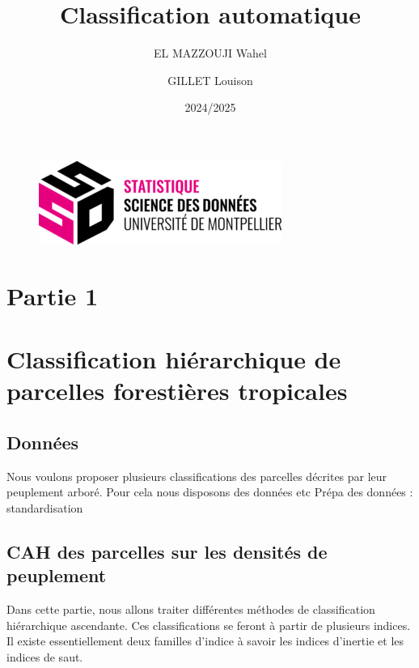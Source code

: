 \documentclass[
]{article}
\title{Classification automatique}
\author{EL MAZZOUJI Wahel \and GILLET Louison}
\date{2024/2025}
\begin{document}
\maketitle

\begin{figure}[h!]
    \centering
    \includegraphics[width=0.5\linewidth]{images/ssd.png}
\end{figure}

\newpage

\tableofcontents

\newpage

\hypertarget{partie-1}{%
\section{Partie 1}\label{partie-1}}

\hypertarget{classification-hiuxe9rarchique-de-parcelles-forestiuxe8res-tropicales}{%
\section{Classification hiérarchique de parcelles forestières
tropicales}\label{classification-hiuxe9rarchique-de-parcelles-forestiuxe8res-tropicales}}

\hypertarget{donnuxe9es}{%
\subsection{Données}\label{donnuxe9es}}

Nous voulons proposer plusieurs classifications des parcelles décrites
par leur peuplement arboré. Pour cela nous disposons des données etc
Prépa des données : standardisation

\hypertarget{cah-des-parcelles-sur-les-densituxe9s-de-peuplement}{%
\subsection{CAH des parcelles sur les densités de
peuplement}\label{cah-des-parcelles-sur-les-densituxe9s-de-peuplement}}

Dans cette partie, nous allons traiter différentes méthodes de
classification hiérarchique ascendante. Ces classifications se feront à
partir de plusieurs indices. Il existe essentiellement deux familles
d'indice à savoir les indices d'inertie et les indices de saut.
\end{document}
